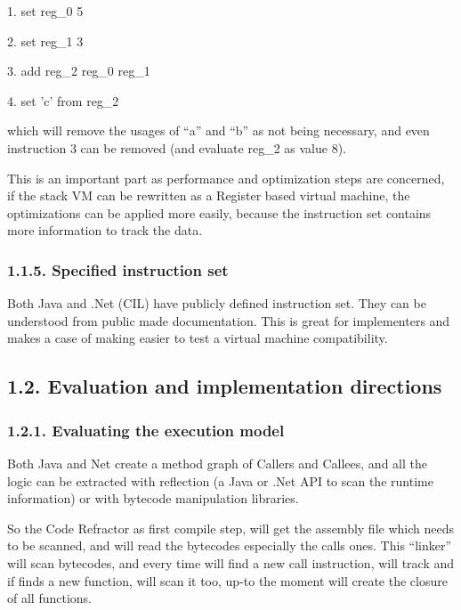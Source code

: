 \documentclass[letterpaper]{article}
\begin{document}
1. set reg\_0 5

2. set reg\_1 3 

3. add reg\_2 reg\_0 reg\_1

4. set 'c' from reg\_2

which will remove the usages of ``a'' and ``b'' as not being necessary, and even instruction 3 can be removed (and
evaluate reg\_2 as value 8).


\bigskip

This is an important part as performance and optimization steps are concerned, if the stack VM can be rewritten as a
Register based virtual machine, the optimizations can be applied more easily, because the instruction set contains more
information to track the data.


\bigskip


\bigskip

\subsubsection{1.1.5. Specified instruction set}
Both Java and .Net (CIL) have publicly defined instruction set. They can be understood from public made documentation.
This is great for implementers and makes a case of making easier to test a virtual machine compatibility. 


\bigskip

\subsection{}
\clearpage\subsection[1.2. Evaluation and implementation directions ]{1.2. Evaluation and implementation directions }
\subsubsection[1.2.1. Evaluating the execution model]{1.2.1. Evaluating the execution model}

\bigskip

Both Java and Net create a method graph of Callers and Callees, and all the logic can be extracted with reflection (a
Java or .Net API to scan the runtime information) or with bytecode manipulation libraries. 


\bigskip

So the Code Refractor as first compile step, will get the assembly file which needs to be scanned, and will read the
bytecodes especially the calls ones. This ``linker'' will scan bytecodes, and every time will find a new call
instruction, will track and if finds a new function, will scan it too, up-to the moment will create the closure of all
functions. 
\end{document}
